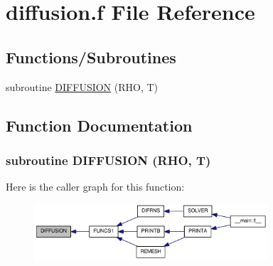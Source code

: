\hypertarget{diffusion_8f}{
\section{diffusion.f File Reference}
\label{diffusion_8f}
}
\subsection*{Functions/Subroutines}
\begin{DoxyCompactItemize}
\item 
subroutine \hyperlink{diffusion_8f_a8ba373466874f486e903a702a195cbc8}{DIFFUSION} (RHO, T)
\end{DoxyCompactItemize}


\subsection{Function Documentation}
\hypertarget{diffusion_8f_a8ba373466874f486e903a702a195cbc8}{
\subsubsection[{DIFFUSION}]{\setlength{\rightskip}{0pt plus 5cm}subroutine DIFFUSION (RHO, \/  T)}}
\label{diffusion_8f_a8ba373466874f486e903a702a195cbc8}


Here is the caller graph for this function:\nopagebreak
\begin{figure}[H]
\begin{center}
\leavevmode
\includegraphics[width=246pt]{diffusion_8f_a8ba373466874f486e903a702a195cbc8_icgraph}
\end{center}
\end{figure}
